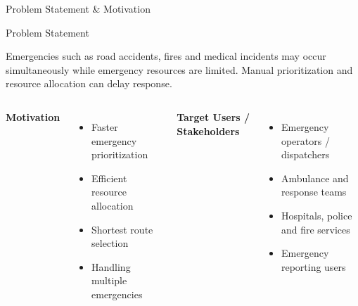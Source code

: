 \documentclass[aspectratio=169,11pt]{beamer}
\begin{document}
\begin{frame}{Problem Statement \& Motivation}

\begin{block}{Problem Statement}

Emergencies such as road accidents, fires and medical incidents
may occur simultaneously while emergency resources are limited.
Manual prioritization and resource allocation can delay response.

\end{block}

\vspace{2mm}

\begin{columns}[T,totalwidth=\textwidth]


\textbf{\color{GEUBlue}Motivation}

\begin{itemize}
\itemsep2pt

\item Faster emergency prioritization
\item Efficient resource allocation
\item Shortest route selection
\item Handling multiple emergencies

\end{itemize}


\textbf{\color{GEUBlue}Target Users / Stakeholders}

\begin{itemize}
\itemsep2pt

\item Emergency operators / dispatchers
\item Ambulance and response teams
\item Hospitals, police and fire services
\item Emergency reporting users

\end{itemize}

\end{columns}

\vfill

\end{frame}
\end{document}
